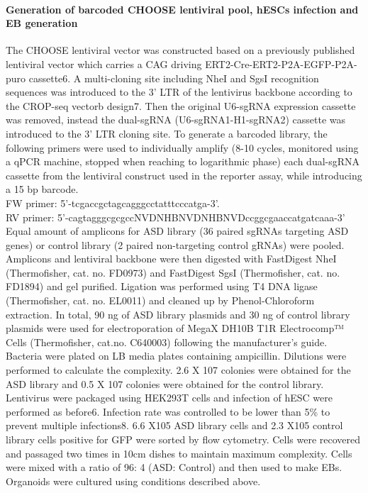 \paragraph{Generation of barcoded CHOOSE lentiviral pool, hESCs infection and EB generation}
The CHOOSE lentiviral vector was constructed based on a previously published lentiviral vector which carries a CAG driving ERT2-Cre-ERT2-P2A-EGFP-P2A-puro cassette6. A multi-cloning site including NheI and SgsI recognition sequences was introduced to the 3’ LTR of the lentivirus backbone according to the CROP-seq vectorb design7. Then the original U6-sgRNA expression cassette was removed, instead the dual-sgRNA (U6-sgRNA1-H1-sgRNA2) cassette was introduced to the 3’ LTR cloning site. To generate a barcoded library, the following primers were used to individually amplify (8-10 cycles, monitored using a qPCR machine, stopped when reaching to logarithmic phase) each dual-sgRNA cassette from the lentiviral construct used in the reporter assay,  while introducing a 15 bp barcode. \\
FW primer: 5’-tcgaccgctagcagggcctatttcccatga-3’. \\
RV primer: 5’-cagtagggcgcgccNVDNHBNVDNHBNVDccggcgaaccatgatcaaa-3’ \\
Equal amount of amplicons for ASD library (36 paired sgRNAs targeting ASD genes) or control library (2 paired non-targeting control gRNAs) were pooled. Amplicons and lentiviral backbone were then digested with FastDigest NheI (Thermofisher, cat. no. FD0973) and FastDigest SgsI (Thermofisher, cat. no. FD1894) and gel purified. Ligation was performed using T4 DNA ligase (Thermofisher, cat. no. EL0011) and cleaned up by Phenol-Chloroform extraction. In total, 90 ng of ASD library plasmids and 30 ng of control library plasmids were used for electroporation of MegaX DH10B T1R Electrocomp™ Cells (Thermofisher, cat.no. C640003) following the manufacturer's guide. Bacteria were plated on LB media plates containing ampicillin. Dilutions were performed to calculate the complexity. 2.6 X 107 colonies were obtained for the ASD library and 0.5 X 107 colonies were obtained for the control library. Lentivirus were packaged using HEK293T cells and infection of hESC were performed as before6.  Infection rate was controlled to be lower than 5\% to prevent multiple infections8. 6.6 X105 ASD library cells and 2.3 X105 control library cells positive for GFP were sorted by flow cytometry. Cells were recovered and passaged two times in 10cm dishes to maintain maximum complexity. Cells were mixed with a ratio of 96: 4 (ASD: Control) and then used to make EBs. Organoids were cultured using conditions described above. 

